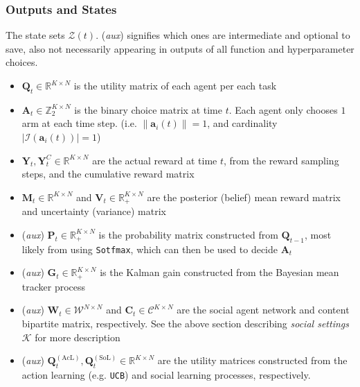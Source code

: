 \documentclass[fleqn]{article}
\begin{document}
\subsubsection*{Outputs and States}

The state sets $\mathcal{Z}(t)$. (\textit{aux}) signifies which ones are intermediate and optional to save, also not necessarily appearing in outputs of all function and hyperparameter choices.

\begin{itemize}
    \item $\mathbf{Q}_t \in \mathbb{R}^{K \times N}$
        is the utility matrix of each agent per each task
    \item $\mathbf{A}_t \in \mathbb{Z}_2^{K \times N}$
        is the binary choice matrix at time $t$.
        Each agent only chooses $1$ arm at each time step.
        (i.e. $\lVert \mathbf{a}_i(t) \rVert = 1$,
        and cardinality $|\mathcal{I}(\mathbf{a}_i(t))| = 1$)
    \item $\mathbf{Y}_t, \mathbf{Y}^{C}_t \in \mathbb{R}^{K \times N}$
        are the actual reward at time $t$,
        from the reward sampling steps,
        and the cumulative reward matrix
    \item $\mathbf{M}_t \in \mathbb{R}^{K \times N}$
        and $\mathbf{V}_t \in \mathbb{R}_{+}^{K \times N}$
        are the posterior (belief) mean reward matrix
        and uncertainty (variance) matrix
    \item (\textit{aux}) $\mathbf{P}_t \in \mathbb{R}_{+}^{K \times N}$
        is the probability matrix constructed from $\mathbf{Q}_{t-1}$,
        most likely from using \texttt{Sotfmax},
        which can then be used to decide $\mathbf{A}_t$
    \item (\textit{aux}) $\mathbf{G}_t \in \mathbb{R}_{+}^{K \times N}$
        is the Kalman gain constructed from the Bayesian mean tracker process
    \item (\textit{aux}) $\mathbf{W}_t \in \mathcal{W}^{N \times N}$
        and $\mathbf{C}_t \in \mathcal{C}^{K \times N}$
        are the social agent network and
        content bipartite matrix, respectively.
        See the above section describing \textit{social settings} $\mathcal{K}$ for more description
    \item (\textit{aux}) $
        \mathbf{Q}^{\mathrm{(AcL)}}_t,
        \mathbf{Q}^{\mathrm{(SoL)}}_t
        \in \mathbb{R}^{K \times N}$
        are the utility matrices constructed from the action learning (e.g. \texttt{UCB})
        and social learning processes, respectively.
\end{itemize}
\end{document}
